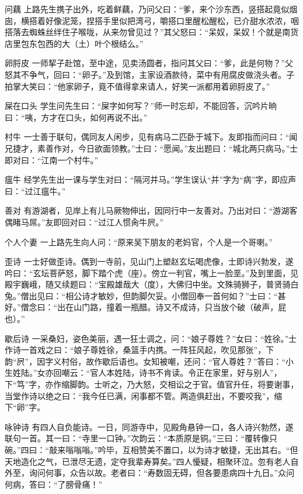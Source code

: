 \documentclass[12pt,UTF8]{ctexbook}
\begin{document}
问藕
上路先生携子出外，吃着鲜藕，乃问父曰：“爹，来个沙东西，竖搭起竟似烟囱，横搭着好像泥笼，捏搭手里似把湾弓，嚼搭口里醒松醒松，已介甜水浓浓，咽搭落去蜘蛛丝绊住子喉咙，从来勿曾见过？”其父怒曰：“呆奴，呆奴！个就是南货店里包东包西的大（土）叶个根结么。”

卵脟皮
一师挈子赴馆，至中途，见卖汤圆者，指问其父曰：“爹，此是何物？”父怒其不争气，回曰：“卵子。”及到馆，主家设酒款待，菜中有用腐皮做浇头者。子拍掌大笑曰：“他家卵子，竟不值得拿来请人，好笑一派都用着卵脟皮了。”

屎在口头
学生问先生曰：“屎字如何写？”师一时忘却，不能回答，沉吟片晌曰：“咦，方才在口头，如何再说不出。”

村牛
一士善于联句，偶同友人闲步，见有病马二匹卧于城下。友即指而问曰：“闻兄捷才，素善作对，今日欲面领教。”士曰：“愿闻。”友出题曰：“城北两只病马。”士即对曰：“江南一个村牛。”

瘟牛
经学先生出一课与学生对曰：“隔河并马。”学生误认“并”字为“病”字，即应声曰：“过江瘟牛。”

善对
有游湖者，见岸上有儿马厥物伸出，因同行中一友善对。乃出对曰：“游湖客偶睹马屌。”友即回对曰：“过江人惯肏牛屄。”

个人个妻
一上路先生向人问：“原来吴下朋友的老妈官，个人是一个哥喇。”

歪诗
一士好做歪诗。偶到一寺前，见山门上塑赵玄坛喝虎像，士即诗兴勃发，遂吟曰：“玄坛菩萨怒，脚下踏个虎（座）。傍立一判官，嘴上一脸垩。”及到里面，见殿宇巍峨，随又续题曰：“宝殿雄哉大（度），大佛归中坐。文殊骑狮子，普贤骑白兔。”僧出见曰：“相公诗才敏妙，但韵脚欠妥。小僧回奉一首何如？”士曰：“甚好。”僧念曰：“出在山门路，撞着一瓶醋。诗又不成诗，只当放个破（破声，屁也）。”

歇后诗
一采桑妇，姿色美丽，遇一狂士调之，问：“娘子尊姓？”女曰：“姓徐。”士作诗一首戏之曰：“娘子尊姓徐，桑篮手内携。一阵狂风起，吹见那张”，下韵“屄”，因字义村俗，故作歇后语也。女知被嘲，还问：“官人尊姓？”答曰：“小生姓陆。”女亦回嘲云：“官人本姓陆，诗书不肯读。令正在家里，好与别人”，下“笃”字，亦作缩脚韵。士听之，乃大怒，交相讼之于官。值官升任，将要谢事，当堂作诗以绝之曰：“我今任已满，闲事都不管。两造俱赶出，不要咬我”，缩下“卵”字。

咏钟诗
有四人自负能诗。一日，同游寺中，见殿角悬钟一口，各人诗兴勃然，遂联句一首。其一曰：“寺里一口钟。”次韵云：“本质原是铜。”三曰：“覆转像只碗。”四曰：“敲来嗡嗡嗡。”吟毕，互相赞美不置口，以为诗才敏捷，无出其右。“但天地造化之气，已泄尽无遗，定夺我辈寿算矣。”四人懮疑，相聚环泣。忽有老人自外至，询问何事，众告以故。老者曰：“寿数固无碍，但各要患病四十九日。”众问何病，答曰：“了膀骨痛！”
\end{document}
